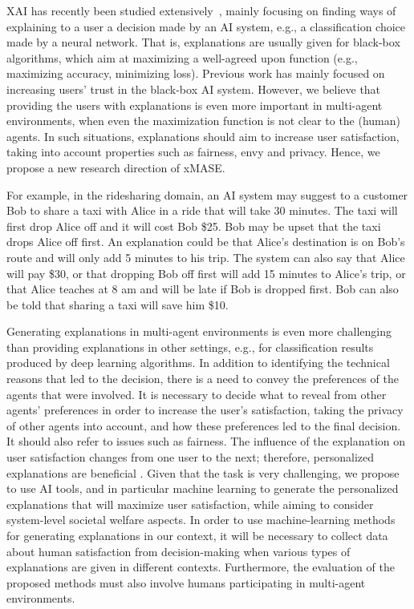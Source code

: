 \documentclass[letterpaper]{article} %
\begin{document}
\ac{XAI} has recently been studied extensively~\cite{core2006building,carvalho2019machine,rosenfeld2019explainability}, %
mainly focusing on finding ways of explaining to a user a decision made by an AI system, e.g., a classification choice made by a neural network. That is, explanations are usually given for black-box algorithms, which aim at maximizing a well-agreed upon function (e.g., maximizing accuracy, minimizing loss). Previous work has mainly focused on increasing users' trust in the black-box AI system. However, we believe that providing the users with explanations is even more important in multi-agent environments, when even the maximization function is not clear to the (human) agents. In such situations, explanations should aim to increase user satisfaction, taking into account properties such as fairness, envy and privacy. Hence, we propose a new research direction of \acf{xMASE}.  

For example, in the ridesharing domain, an AI system may suggest to a customer Bob to share a taxi with Alice in a ride that will take 30 minutes.
The taxi will first drop Alice off and it will cost Bob \$25. Bob may be upset that the taxi drops Alice off first. An explanation could be that 
Alice's destination is on Bob's route and will only add 5 minutes to his trip. The system can also say that Alice will pay \$30, or that dropping Bob off first will add 15 minutes to Alice's trip, or that Alice teaches at 8 am and will be late if Bob is dropped first. Bob can also be told that sharing a taxi will save him \$10.

Generating explanations in multi-agent environments is even more challenging than providing explanations in other settings, e.g., for classification results produced by deep learning algorithms.
In addition to identifying the technical reasons that led to the decision, there is a need to convey the preferences of the agents that were involved. It is necessary to decide what to reveal from other agents' preferences in order to increase the user's satisfaction, taking the privacy of other agents into account, and how these preferences led to the final decision. It should also refer to issues such as fairness. The influence of the explanation on user satisfaction changes from one user to the next; therefore, personalized explanations are beneficial \cite{Lakkaraju2019FaithfulAC,bradley2009dealing}.
Given that the task is very challenging, we propose to use AI tools, and in particular machine learning to generate the personalized explanations that will maximize user satisfaction, while aiming to consider system-level societal welfare aspects. 
In order to use machine-learning methods for generating explanations in our context, it will be necessary to collect data about human satisfaction from decision-making when various types of explanations are given in different contexts. Furthermore, the evaluation of the proposed methods must also involve humans participating in multi-agent environments. 
\end{document}
